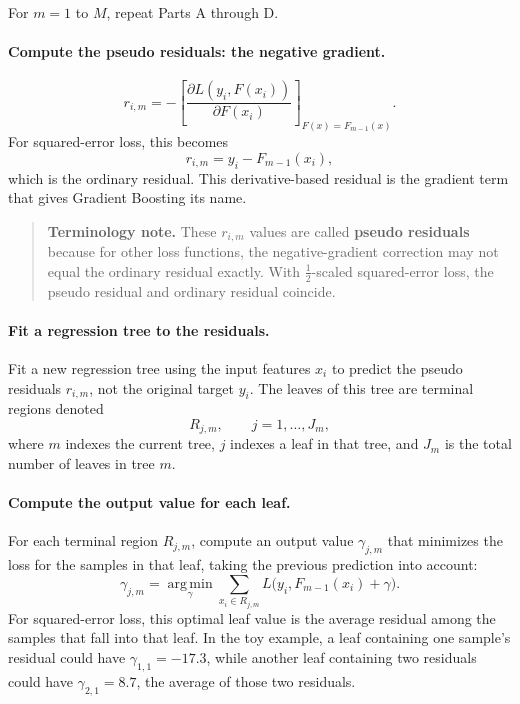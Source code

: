 \documentclass[12pt,openany]{book}
\begin{document}
For \(m=1\) to \(M\), repeat Parts A through D.

\paragraph{Compute the pseudo residuals: the negative gradient.}
\begin{equation*}
    r_{i,m}
    = -\left[\frac{\partial L(y_i,F(x_i))}{\partial F(x_i)}\right]_{F(x)=F_{m-1}(x)}.
\end{equation*}
For squared-error loss, this becomes
\begin{equation*}
    r_{i,m}=y_i-F_{m-1}(x_i),
\end{equation*}
which is the ordinary residual. This derivative-based residual is the gradient term that gives Gradient Boosting its name.

\begin{quote}
\textbf{Terminology note.} These \(r_{i,m}\) values are called \textbf{pseudo residuals} because for other loss functions, the negative-gradient correction may not equal the ordinary residual exactly. With \(\frac{1}{2}\)-scaled squared-error loss, the pseudo residual and ordinary residual coincide.
\end{quote}

\paragraph{Fit a regression tree to the residuals.}
Fit a new regression tree using the input features \(x_i\) to predict the pseudo residuals \(r_{i,m}\), not the original target \(y_i\). The leaves of this tree are terminal regions denoted
\begin{equation*}
    R_{j,m}, \qquad j=1,\dots,J_m,
\end{equation*}
where \(m\) indexes the current tree, \(j\) indexes a leaf in that tree, and \(J_m\) is the total number of leaves in tree \(m\).

\paragraph{Compute the output value for each leaf.}
For each terminal region \(R_{j,m}\), compute an output value \(\gamma_{j,m}\) that minimizes the loss for the samples in that leaf, taking the previous prediction into account:
\begin{equation*}
    \gamma_{j,m}
    = \operatorname*{arg\,min}_{\gamma}
      \sum_{x_i\in R_{j,m}}
      L\big(y_i, F_{m-1}(x_i)+\gamma\big).
\end{equation*}
For squared-error loss, this optimal leaf value is the average residual among the samples that fall into that leaf. In the toy example, a leaf containing one sample's residual could have \(\gamma_{1,1}=-17.3\), while another leaf containing two residuals could have \(\gamma_{2,1}=8.7\), the average of those two residuals.
\end{document}
